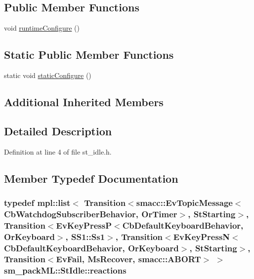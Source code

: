 \subsection*{Public Member Functions}
\begin{DoxyCompactItemize}
\item 
void \hyperlink{structsm__packML_1_1StIdle_a4b0427716c4054b1345876384066473e}{runtime\+Configure} ()
\end{DoxyCompactItemize}
\subsection*{Static Public Member Functions}
\begin{DoxyCompactItemize}
\item 
static void \hyperlink{structsm__packML_1_1StIdle_a946ecb6d3aeee4886ea37640ec630385}{static\+Configure} ()
\end{DoxyCompactItemize}
\subsection*{Additional Inherited Members}


\subsection{Detailed Description}


Definition at line 4 of file st\+\_\+idle.\+h.



\subsection{Member Typedef Documentation}
\subsubsection[{\texorpdfstring{reactions}{reactions}}]{\setlength{\rightskip}{0pt plus 5cm}typedef mpl\+::list$<$ Transition$<${\bf smacc\+::\+Ev\+Topic\+Message}$<${\bf Cb\+Watchdog\+Subscriber\+Behavior}, {\bf Or\+Timer}$>$, {\bf St\+Starting}$>$, Transition$<$Ev\+Key\+PressP$<$Cb\+Default\+Keyboard\+Behavior, {\bf Or\+Keyboard}$>$, {\bf S\+S1\+::\+Ss1}$>$, Transition$<$Ev\+Key\+PressN$<$Cb\+Default\+Keyboard\+Behavior, {\bf Or\+Keyboard}$>$, {\bf St\+Starting}$>$, Transition$<${\bf Ev\+Fail}, {\bf Ms\+Recover}, {\bf smacc\+::\+A\+B\+O\+RT}$>$ $>$ {\bf sm\+\_\+pack\+M\+L\+::\+St\+Idle\+::reactions}}\hypertarget{structsm__packML_1_1StIdle_a6b6c87d8cf7ac6b95210a8274ca2f4b3}{}\label{structsm__packML_1_1StIdle_a6b6c87d8cf7ac6b95210a8274ca2f4b3}


